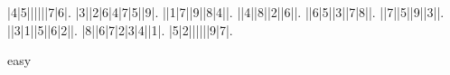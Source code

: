 \begin{sudoku}
|4|5||||||7|6|.
|3||2|6|4|7|5||9|.
||1|7||9||8|4||.
||4||8||2||6||.
||6|5||3||7|8||.
||7||5||9||3||.
||3|1||5||6|2||.
|8||6|7|2|3|4||1|.
|5|2||||||9|7|.
\end{sudoku}
\begin{center}
easy\end{center}